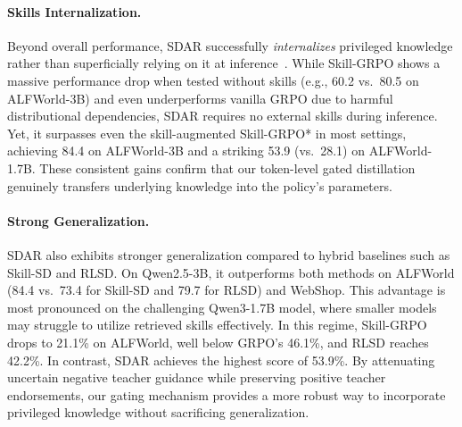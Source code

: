 \documentclass{llmxive}
\providecommand{\methodname}{\textsc{SDAR}\xspace}
\begin{document}
\paragraph{Skills Internalization.}                                                           
Beyond overall performance, \methodname{} successfully \emph{internalizes} privileged knowledge rather than superficially relying on it at inference~\citep{lu2026skill0}. While Skill-GRPO shows a massive performance drop when tested without skills (e.g., 60.2 vs.\ 80.5 on ALFWorld-3B) and even underperforms vanilla GRPO due to harmful distributional dependencies, \methodname{} requires no external skills during inference. Yet, it surpasses even the skill-augmented Skill-GRPO* in most settings, achieving 84.4 on ALFWorld-3B and a striking 53.9 (vs.\ 28.1) on ALFWorld-1.7B. These consistent gains confirm that our token-level gated distillation genuinely transfers underlying knowledge into the policy's parameters.

\paragraph{Strong Generalization.}                                                            
\methodname{} also exhibits stronger generalization compared to hybrid baselines such as Skill-SD and RLSD.
On Qwen2.5-3B, it outperforms both methods on ALFWorld (84.4 vs.\ 73.4 for Skill-SD and 79.7 for RLSD) and WebShop.
This advantage is most pronounced on the challenging Qwen3-1.7B model, where smaller models may struggle to utilize retrieved skills effectively.
In this regime, Skill-GRPO drops to 21.1\% on ALFWorld, well below GRPO's 46.1\%, and RLSD reaches 42.2\%.
In contrast, \methodname{} achieves the highest score of 53.9\%.
By attenuating uncertain negative teacher guidance while preserving positive teacher endorsements, our gating mechanism provides a more robust way to incorporate privileged knowledge without sacrificing generalization.
\end{document}
